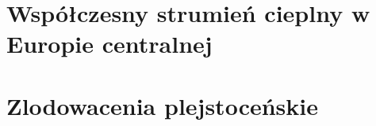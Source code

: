 \documentclass[11.5pt,twoside]{report}
\begin{document}

	\section{Współczesny strumień cieplny w Europie centralnej}
	
	
	\section{Zlodowacenia plejstoceńskie}
	
\end{document}
